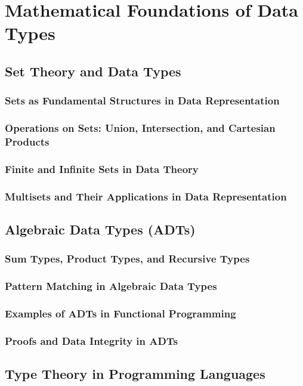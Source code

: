 \documentclass[12pt, oneside]{book}
\begin{document}
\section{Mathematical Foundations of Data Types}
\subsection{Set Theory and Data Types}
\subsubsection{Sets as Fundamental Structures in Data Representation}
\subsubsection{Operations on Sets: Union, Intersection, and Cartesian Products}
\subsubsection{Finite and Infinite Sets in Data Theory}
\subsubsection{Multisets and Their Applications in Data Representation}
\subsection{Algebraic Data Types (ADTs)}
\subsubsection{Sum Types, Product Types, and Recursive Types}
\subsubsection{Pattern Matching in Algebraic Data Types}
\subsubsection{Examples of ADTs in Functional Programming}
\subsubsection{Proofs and Data Integrity in ADTs}
\subsection{Type Theory in Programming Languages}
\end{document}
